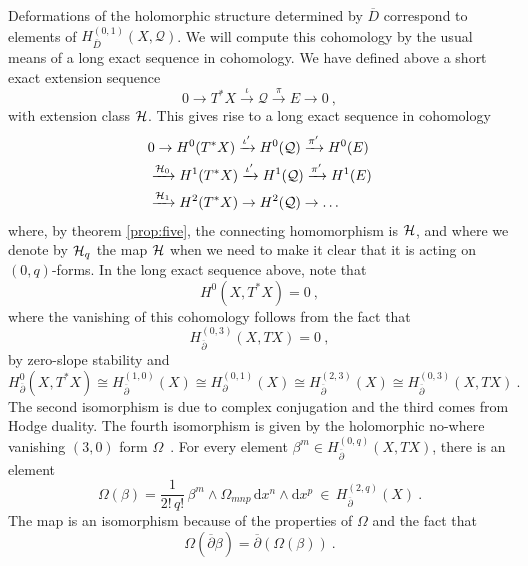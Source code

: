\documentclass[12pt,a4paper]{article}
\def\bar#1{\overline{#1}}
\let\p=\partial
\def\d{\textrm{d}}
\def\bp{\bar{\partial}}
\def\Q{\mathcal{Q}}
\theoremstyle{definition}
\begin{document}
Deformations of the holomorphic structure determined by $\bar D$ correspond to elements of $H^{(0,1)}_{\bar D}(X, \Q)$. We will compute this cohomology by the usual means of a long exact sequence in cohomology. We have defined above a short exact extension sequence
\begin{equation}
0\rightarrow T^*X\xrightarrow{\iota}\Q\xrightarrow{\pi}E\rightarrow0\:,\label{eq:sesH}
\end{equation}
with extension class $\cal H$. This gives rise to a long exact sequence in cohomology
\begin{equation} 
\begin{split}
& 0 \rightarrow H^0(T^*X)\xrightarrow{\iota'} H^0(\Q) \xrightarrow{\pi'} H^0(E) \\
&\xrightarrow{{\cal H}_0} H^1(T^*X) \xrightarrow{\iota'} H^1(\Q) \xrightarrow{\pi'} H^1(E) \\
&\xrightarrow{{\cal H}_1} H^{2}(T^*X) \rightarrow H^2(\Q) \rightarrow \ldots
\end{split}
\label{eq:les3}
\end{equation}
where, by theorem \ref{prop:five}, the connecting homomorphism  is $\cal H$, and where we denote by ${\cal H}_q$ the map $\cal H$ when we need to make it clear that it is acting on $(0,q)$-forms.
In the long exact sequence above, note that
\[H^0(X,T^*X)=0~,\]
where the vanishing of this cohomology follows from the fact that
\[ H_{\bp}^{(0,3)}(X, TX) = 0~,\]
by zero-slope stability and
\[ H_{\bp}^0(X,T^*X) \cong
H_{\bp}^{(1,0)}(X) \cong
H_{\p}^{(0,1)}(X) \cong
H_{\bp}^{(2,3)}(X) \cong
H_{\bp}^{(0,3)}(X, TX) ~.\]
The second isomorphism is due to complex conjugation and the third comes from Hodge duality.  The fourth isomorphism is given by the holomorphic no-where vanishing $(3,0)$ form $\Omega$~\cite{MR915841}. For every element  $\beta^m\in H_{\bp}^{(0,q)}(X, TX)$, there is  an element 
\[ \Omega(\beta) = \frac{1}{2!\,q!}\, \beta^m\wedge\Omega_{mnp}\, \d x^n\wedge\d x^p\ \in \, H_{\bp}^{(2,q)}(X)~.\]
The map is an isomorphism because of the properties of $\Omega $ and the fact that 
\[ \Omega(\bp\beta) = \bp(\Omega(\beta))~.\]
\end{document}
